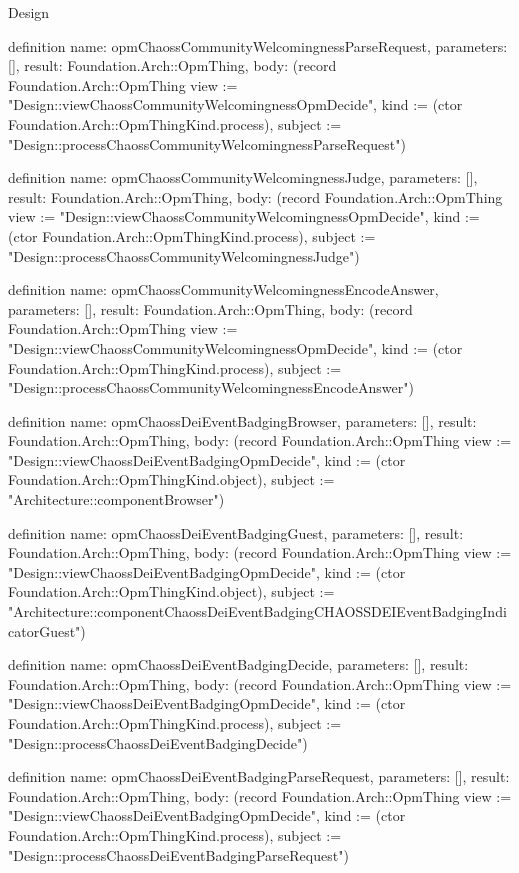 \begin{lexlean}{Design}
\begin{semanticmodule}
definition{
  name: opmChaossCommunityWelcomingnessParseRequest,
  parameters: [],
  result: Foundation.Arch::OpmThing,
  body: (record Foundation.Arch::OpmThing {view := "Design::viewChaossCommunityWelcomingnessOpmDecide", kind := (ctor Foundation.Arch::OpmThingKind.process), subject := "Design::processChaossCommunityWelcomingnessParseRequest"})
}

definition{
  name: opmChaossCommunityWelcomingnessJudge,
  parameters: [],
  result: Foundation.Arch::OpmThing,
  body: (record Foundation.Arch::OpmThing {view := "Design::viewChaossCommunityWelcomingnessOpmDecide", kind := (ctor Foundation.Arch::OpmThingKind.process), subject := "Design::processChaossCommunityWelcomingnessJudge"})
}

definition{
  name: opmChaossCommunityWelcomingnessEncodeAnswer,
  parameters: [],
  result: Foundation.Arch::OpmThing,
  body: (record Foundation.Arch::OpmThing {view := "Design::viewChaossCommunityWelcomingnessOpmDecide", kind := (ctor Foundation.Arch::OpmThingKind.process), subject := "Design::processChaossCommunityWelcomingnessEncodeAnswer"})
}

definition{
  name: opmChaossDeiEventBadgingBrowser,
  parameters: [],
  result: Foundation.Arch::OpmThing,
  body: (record Foundation.Arch::OpmThing {view := "Design::viewChaossDeiEventBadgingOpmDecide", kind := (ctor Foundation.Arch::OpmThingKind.object), subject := "Architecture::componentBrowser"})
}

definition{
  name: opmChaossDeiEventBadgingGuest,
  parameters: [],
  result: Foundation.Arch::OpmThing,
  body: (record Foundation.Arch::OpmThing {view := "Design::viewChaossDeiEventBadgingOpmDecide", kind := (ctor Foundation.Arch::OpmThingKind.object), subject := "Architecture::componentChaossDeiEventBadgingCHAOSSDEIEventBadgingIndicatorGuest"})
}

definition{
  name: opmChaossDeiEventBadgingDecide,
  parameters: [],
  result: Foundation.Arch::OpmThing,
  body: (record Foundation.Arch::OpmThing {view := "Design::viewChaossDeiEventBadgingOpmDecide", kind := (ctor Foundation.Arch::OpmThingKind.process), subject := "Design::processChaossDeiEventBadgingDecide"})
}

definition{
  name: opmChaossDeiEventBadgingParseRequest,
  parameters: [],
  result: Foundation.Arch::OpmThing,
  body: (record Foundation.Arch::OpmThing {view := "Design::viewChaossDeiEventBadgingOpmDecide", kind := (ctor Foundation.Arch::OpmThingKind.process), subject := "Design::processChaossDeiEventBadgingParseRequest"})
}


\end{semanticmodule}
\end{lexlean}
